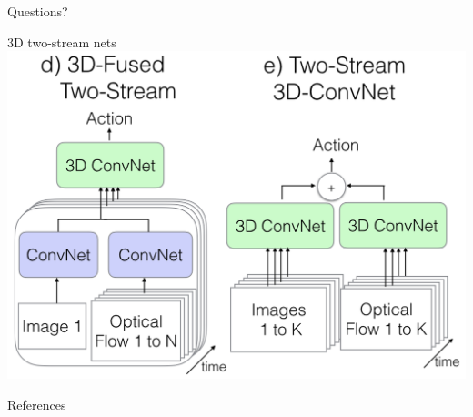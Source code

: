 \documentclass{beamer}
\begin{document}

\begin{frame}[standout]
        Questions?
\end{frame}

\appendix

\begin{frame}[fragile]{3D two-stream nets}
        \includegraphics[scale=0.3]{data/two-stream-3d.png}
\end{frame}

\begin{frame}[allowframebreaks]{References}
        
        
\end{frame}
\end{document}

